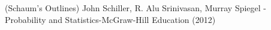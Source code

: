 \newpage
{}
\begin{thebibliography}{9}
        (Schaum’s Outlines) John Schiller, R. Alu Srinivasan, Murray Spiegel - Probability and Statistics-McGraw-Hill Education (2012)
        \lipsum[2][1-3]
        \lipsum[3][1-3]
        \lipsum[4][1-3]
        \lipsum[5][1-3]
        \lipsum[6][1-3]
\end{thebibliography}

